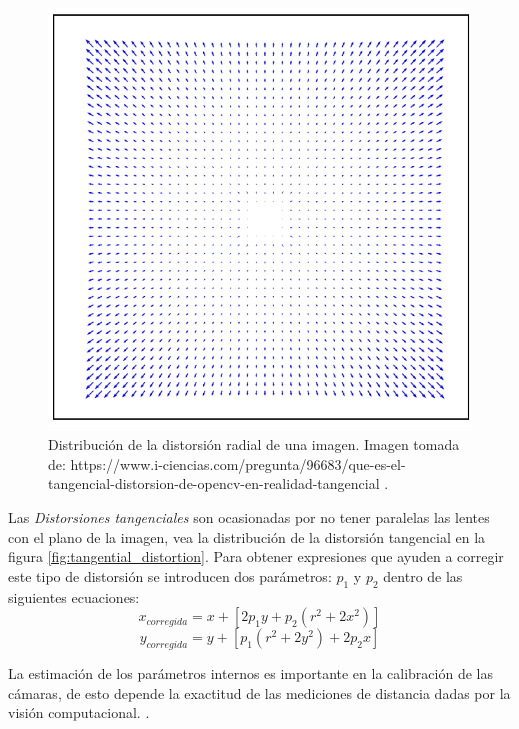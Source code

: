 \begin{figure}
\centering
\includegraphics[scale=0.75]{images/radial_distortion.png}
\caption{Distribución de la distorsión radial de una imagen. Imagen tomada de: https://www.i-ciencias.com/pregunta/96683/que-es-el-tangencial-distorsion-de-opencv-en-realidad-tangencial .}
\label{fig:radial_distortion}
\end{figure}

Las \textit{Distorsiones tangenciales} son ocasionadas por no tener paralelas las lentes con el plano de la imagen, vea la distribución de la distorsión tangencial en la figura \ref{fig:tangential_distortion}. Para obtener expresiones que ayuden a corregir este tipo de distorsión se introducen dos parámetros: $p_{1}$ y $p_{2}$ dentro de las siguientes ecuaciones:
\[x_{corregida} = x + [2p_1y+p_2(r^2+2x^2)]\]
\[y_{corregida} = y + [p_1(r^2+2y^2)+2p_2x]\]

La estimación de los parámetros internos es importante en la calibración de las cámaras, de esto depende la exactitud de las mediciones de distancia dadas por la visión computacional. \cite{bradski2008learning}.

